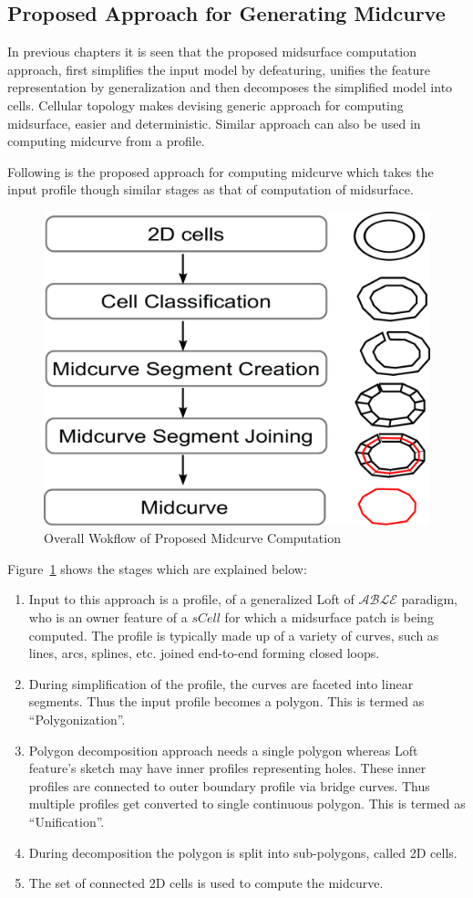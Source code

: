 \subsection{Proposed Approach for Generating Midcurve}
In previous chapters it is seen that the proposed midsurface computation approach, first simplifies the input model by defeaturing, unifies the feature representation by generalization and then decomposes the simplified model into cells. Cellular topology makes devising generic approach for computing midsurface, easier and deterministic. Similar approach can also be used in computing midcurve from a profile.

Following is the proposed approach for computing midcurve which takes the input profile though similar stages as that of computation of midsurface. 
 

\begin{figure}[h]
\centering \includegraphics[width=0.5\linewidth]{images/SystemArchitectureMidcurve_2.pdf} 
\caption{Overall Wokflow of Proposed Midcurve Computation}
\label{fig_sysarchmidcurve}
\end{figure}


Figure~\ref{fig_sysarchmidcurve} shows the stages which are explained below:

\begin{enumerate} [noitemsep,topsep=2pt,parsep=2pt,partopsep=2pt]
\item Input to this approach is a profile, of a generalized Loft of $\mathcal{ABLE}$ paradigm, who is an owner feature of a $sCell$ for which a midsurface patch is being computed. The profile is typically made up of a variety of curves, such as lines, arcs, splines, etc. joined end-to-end forming closed loops. 
\item During simplification of the profile, the curves are faceted into linear segments. Thus the input profile becomes a polygon. This is termed as ``Polygonization''.
\item Polygon decomposition approach needs a single polygon whereas Loft feature's sketch may have inner profiles representing holes. These inner profiles are connected to outer boundary profile via bridge curves. Thus multiple profiles get converted to single continuous polygon. This is termed as ``Unification''.
\item During decomposition the polygon is split into sub-polygons, called 2D cells.
\item The set of connected 2D cells is used to compute the midcurve.
\end{enumerate}


